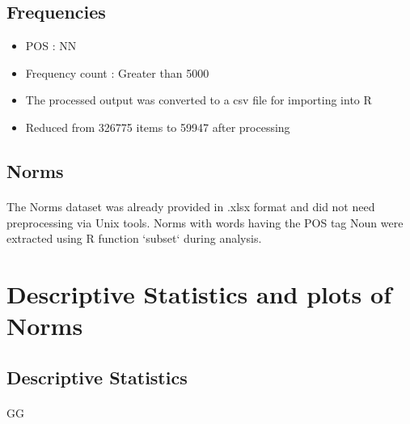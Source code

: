 \documentclass[11pt,a4paper]{article}
\begin{document}
\subsection{Frequencies}
\begin{itemize}
	\item POS : NN
	\item Frequency count : Greater than 5000
	\item The processed output was converted to a csv file for importing into R
	\item Reduced from 326775 items to 59947 after processing
\end{itemize}


\subsection{Norms}
\paragraph{}
The Norms dataset was already provided in .xlsx format and did not need preprocessing via Unix tools. Norms with words having the POS tag Noun were extracted using R function `subset` during analysis.


\section{Descriptive Statistics and plots of Norms}

\subsection{Descriptive Statistics}
\paragraph{}
GG





\end{document}
